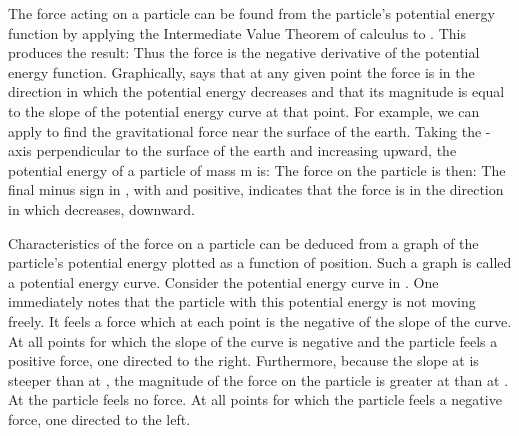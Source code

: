 {
The force acting on a particle can be found from the particle's potential
energy function by applying the Intermediate Value Theorem of calculus to
.
%
%
This produces the result:
%
%
Thus the force is the negative derivative of the potential energy function.
%
Graphically,  says that at any given point the force is in the
direction in which the potential energy decreases and that its magnitude is
equal to the slope of the potential energy curve at that point.
%
%
For example, we can apply  to find the gravitational force near the
surface of the earth.
Taking the -axis perpendicular to the surface of the earth and increasing
upward, the potential energy of a particle of mass m is:
%
%
%
The force on the particle is then:
%
%
The final minus sign in , with  and  positive, indicates that the
force is in the direction in which  decreases, downward.


Characteristics of the force on a particle can be deduced from a graph of
the particle's potential energy plotted as a function of position.
Such a graph is called a potential energy curve.
Consider the potential energy curve in .
One immediately notes that the particle with this potential energy is not
moving freely.
It feels a force which at each point is the negative of the slope of the
 curve.
At all points for which  the slope of the curve is negative and
the particle feels a positive force, one directed to the right.
Furthermore, because the slope at  is steeper than at , the magnitude of
the force on the particle is greater at  than at .
At  the particle feels no force.
At all points for which  the particle feels a negative force, one
directed to the left.
}%
